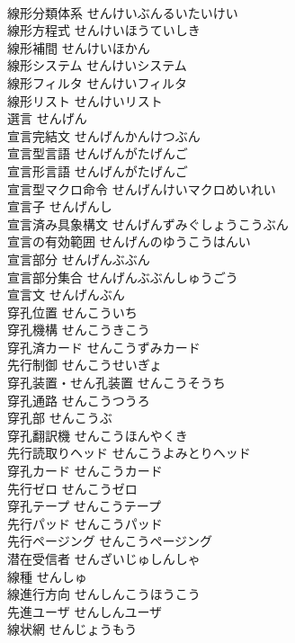 \documentclass[8pt]{extreport}
\begin{document}
\begin{CJK}{UTF8}{min}
\\	線形分類体系	せんけいぶんるいたいけい	
\\	線形方程式	せんけいほうていしき	
\\	線形補間	せんけいほかん	
\\	線形システム	せんけいシステム	
\\	線形フィルタ	せんけいフィルタ	
\\	線形リスト	せんけいリスト	
\\	選言	せんげん	
\\	宣言完結文	せんげんかんけつぶん	
\\	宣言型言語	せんげんがたげんご	
\\	宣言形言語	せんげんがたげんご	
\\	宣言型マクロ命令	せんげんけいマクロめいれい	
\\	宣言子	せんげんし	
\\	宣言済み具象構文	せんげんずみぐしょうこうぶん	
\\	宣言の有効範囲	せんげんのゆうこうはんい	
\\	宣言部分	せんげんぶぶん	
\\	宣言部分集合	せんげんぶぶんしゅうごう	
\\	宣言文	せんげんぶん	
\\	穿孔位置	せんこういち	
\\	穿孔機構	せんこうきこう	
\\	穿孔済カード	せんこうずみカード	
\\	先行制御	せんこうせいぎょ	
\\	穿孔装置・せん孔装置	せんこうそうち	
\\	穿孔通路	せんこうつうろ	
\\	穿孔部	せんこうぶ	
\\	穿孔翻訳機	せんこうほんやくき	
\\	先行読取りヘッド	せんこうよみとりヘッド	
\\	穿孔カード	せんこうカード	
\\	先行ゼロ	せんこうゼロ	
\\	穿孔テープ	せんこうテープ	
\\	先行パッド	せんこうパッド	
\\	先行ページング	せんこうページング	
\\	潜在受信者	せんざいじゅしんしゃ	
\\	線種	せんしゅ	
\\	線進行方向	せんしんこうほうこう	
\\	先進ユーザ	せんしんユーザ	
\\	線状網	せんじょうもう	

\end{CJK}
\end{document}
